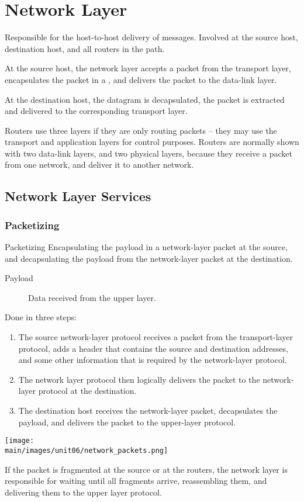 \documentclass[\main/notes.tex]{subfiles}
\begin{document}
		\section{Network Layer}
			Responsible for the host-to-host delivery of messages. Involved at the source host, destination host, and all routers in the path.

			At the source host, the network layer accepts a packet from the transport layer, encapsulates the packet in a , and delivers the packet to the data-link layer.

			At the destination host, the datagram is decapsulated, the packet is extracted and delivered to the corresponding transport layer.

			Routers use three layers if they are only routing packets -- they may use the transport and application layers for control purposes. Routers are normally shown with two data-link layers, and two physical layers, because they receive a packet from one network, and deliver it to another network.

			\subsection{Network Layer Services}
				\subsubsection{Packetizing}
					\begin{definition}{Packetizing}
						Encapsulating the payload in a network-layer packet at the source, and decapsulating the payload from the network-layer packet at the destination.
						\begin{indentparagraph}
							\begin{description}
								\item[Payload] Data received from the upper layer.
							\end{description}
						\end{indentparagraph}
						Done in three steps:
						\begin{enumerate}
							\item The source network-layer protocol receives a packet from the transport-layer protocol, adds a header that contains the source and destination addresses, and some other information that is required by the network-layer protocol.
							\item The network layer protocol then logically delivers the packet to the network-layer protocol at the destination.
							\item The destination host receives the network-layer packet, decapsulates the payload, and delivers the packet to the upper-layer protocol.
						\end{enumerate}
						\begin{center}
							\texttt{[image: \\main/images/unit06/network\_packets.png]}
						\end{center}
						If the packet is fragmented at the source or at the routers, the network layer is responsible for waiting until all fragments arrive, reassembling them, and delivering them to the upper layer protocol.
					\end{definition}
				\pagebreak
\end{document}

